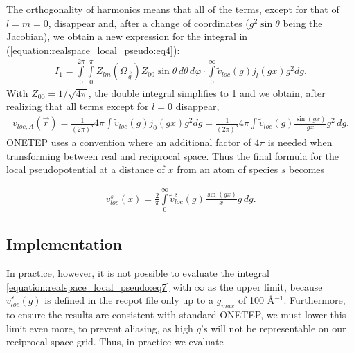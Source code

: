 \documentclass[letterpaper,10pt,english]{sphinxmanual}
\begin{document}
The orthogonality of harmonics means that all of the terms, except for
that of \(l=m=0\), disappear and, after a change of coordinates
(\(g^2\sin{\theta}\) being the Jacobian), we obtain a new expression
for the integral in (\eqref{equation:realspace_local_pseudo:eq4}):
\begin{equation*}
\begin{split}I_1=
\int\limits_{0}^{2\pi}
\int\limits_{0}^{\pi}
Z_{lm}\left(\Omega_{\vec{g}}\right)
Z_{00}
\sin{\theta}\,d\theta\,d\varphi
\cdot\int\limits_{0}^{\infty}{\tilde{v}_{loc}\left(g\right)}{}j_l\left( gx\right)g^2 dg.\end{split}
\end{equation*}
With \(Z_{00}=1/{\sqrt{4\pi}}\), the double integral simplifies to
1 and we obtain, after realizing that all terms except for \(l=0\)
disappear,
\begin{equation*}
\begin{split}{v_{loc,A}\left(\vec{r}\right)}=
\frac{1}{{\left(2\pi\right)}^{3}}
4\pi
\int {\tilde{v}_{loc}\left(g\right)}j_0\!\left( gx\right)g^2 dg
=
\frac{1}{{\left(2\pi\right)}^{3}}
4\pi
\int {\tilde{v}_{loc}\left(g\right)}\frac{\sin\left( g    x\right)}{gx}g^2\,dg.\end{split}
\end{equation*}
ONETEP uses a convention where an additional factor of \(4\pi\) is
needed when transforming between real and reciprocal space. Thus the
final formula for the local pseudopotential at a distance of \(x\)
from an atom of species \(s\) becomes

\label{\detokenize{realspace_local_pseudo:equation-eq7}}\begin{equation}\label{equation:realspace_local_pseudo:eq7}
\begin{split}{v^s_{loc}\left(x\right)}= \frac{2}{\pi}\int\limits_0^{\infty}
{\tilde{v}^s_{loc}\left(g\right)}\frac{\sin\left(gx\right)}{x}g\,dg.\end{split}
\end{equation}

\subsection{Implementation}
\label{\detokenize{realspace_local_pseudo:implementation}}
In practice, however, it is not possible to evaluate the integral
\eqref{equation:realspace_local_pseudo:eq7} with \(\infty\) as the upper limit, because
\({\tilde{v}^s_{loc}\left(g\right)}\) is defined in the recpot file
only up to a \(g_{max}\) of 100 Å\(^{-1}\). Furthermore, to
ensure the results are consistent with standard ONETEP, we must lower
this limit even more, to prevent aliasing, as high \(g\)’s will
not be representable on our reciprocal space grid. Thus, in practice we
evaluate
\end{document}

